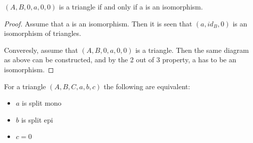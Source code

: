     \begin{corollary}
        $(A,B,0,a,0,0)$ is a triangle if and only if a is an isomorphism.
    \end{corollary}

    \begin{proof}
        Assume that a is an isomorphism. Then it is seen that $(a,id_B,0)$ is an isomorphism of triangles.
        \begin{center}
        \end{center}
        Converesly, assume that $(A,B,0,a,0,0)$ is a triangle. Then the same diagram as above can be constructed, and by the 2 out of 3 property, a has to be an isomorphism.
    \end{proof}

    \begin{lemma}
        For a triangle $(A,B,C,a,b,c)$ the following are equivalent:

        \begin{center}
            \begin{minipage}[c]{0.3\textwidth}
            \end{minipage}
            \begin{minipage}[c]{0.3\textwidth}
                \begin{itemize}
                    \item $a$ is split mono
                    \item $b$ is split epi
                    \item $c = 0$
                \end{itemize}
            \end{minipage}
        \end{center}
    \end{lemma}

